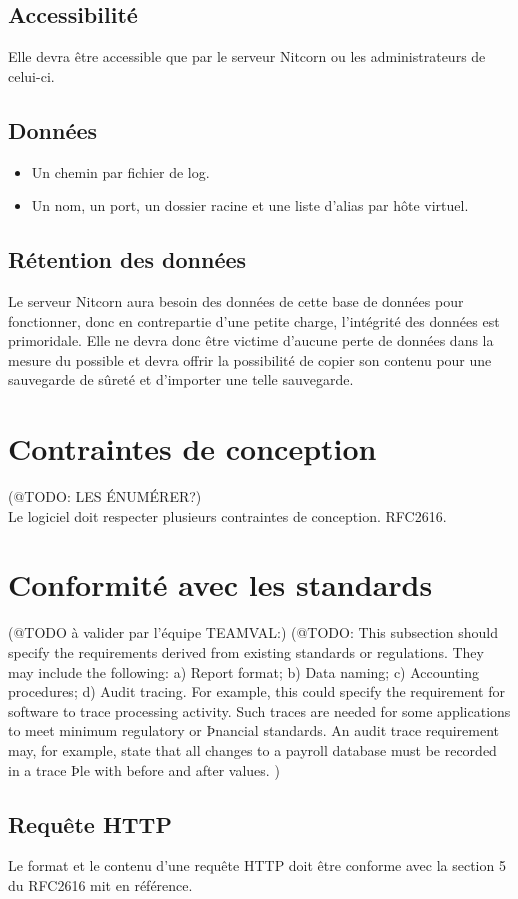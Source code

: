 \documentclass{scrreprt}
\begin{document}
\subsection{Accessibilité}
Elle devra être accessible que par le serveur Nitcorn ou les administrateurs de celui-ci.
\subsection{Données}
\begin{itemize}
	\item Un chemin par fichier de log.
	\item Un nom, un port, un dossier racine et une liste d'alias par hôte virtuel.
\end{itemize}
\subsection{Rétention des données}
Le serveur Nitcorn aura besoin des données de cette base de données pour fonctionner, donc en contrepartie d'une petite charge, l'intégrité des données est primoridale. Elle ne devra donc être victime d'aucune perte de données dans la mesure du possible et devra offrir la possibilité de copier son contenu pour une sauvegarde de sûreté et d'importer une telle sauvegarde.

\section{Contraintes de conception}(@TODO: LES ÉNUMÉRER?)\\ Le logiciel doit respecter plusieurs contraintes de conception. RFC2616.
\section{Conformité avec les standards}
(@TODO à valider par l'équipe TEAMVAL:)
(@TODO: This subsection should specify the requirements derived from existing standards or regulations. They may
include the following:
   a)    Report format;
   b)    Data naming;
   c)    Accounting procedures;
   d)    Audit tracing.
For example, this could specify the requirement for software to trace processing activity. Such traces are
needed for some applications to meet minimum regulatory or Þnancial standards. An audit trace requirement
may, for example, state that all changes to a payroll database must be recorded in a trace Þle with before and
after values.
)
\subsection{Requête HTTP}
Le format et le contenu d'une requête HTTP doit être conforme avec la section 5 du RFC2616\cite{http1.0} mit en référence.
\end{document}
